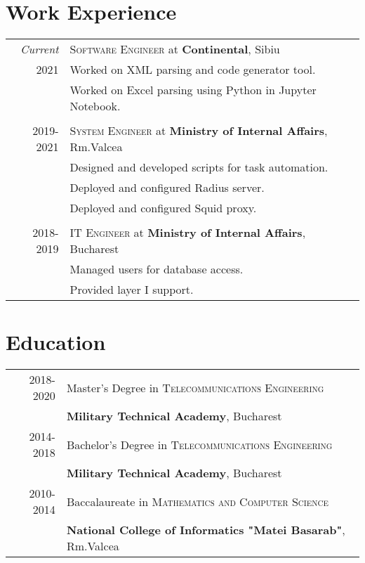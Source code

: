 \documentclass[a4paper,10pt]{article}
\begin{document}
\section{Work Experience}
\begin{tabular}{r|p{11cm}}
\emph{Current}
&\textsc{Software Engineer} at \textbf{Continental}, Sibiu\\
\textsc{2021}
&\footnotesize{Worked on XML parsing and code generator tool.}\\
&\footnotesize{Worked on Excel parsing using Python in Jupyter Notebook.}\\
\multicolumn{2}{c}{}\\
\textsc{2019-2021} 
&\textsc{System Engineer} at \textbf{Ministry of Internal Affairs}, Rm.Valcea\\
&\footnotesize{Designed and developed scripts for task automation.}\\
&\footnotesize{Deployed and configured Radius server.}\\
&\footnotesize{Deployed and configured Squid proxy.}\\
\multicolumn{2}{c}{}\\
\textsc{2018-2019} 
&\textsc{IT Engineer} at \textbf{Ministry of Internal Affairs}, Bucharest\\
&\footnotesize{Managed users for database access.}\\
&\footnotesize{Provided layer I support.}\\
\end{tabular}

\section{Education}
\begin{tabular}{rl}
\textsc{2018-2020}&Master's Degree in 
  \textsc{Telecommunications Engineering}\\
  &\textbf{Military Technical Academy}, Bucharest\\
\textsc{2014-2018}&Bachelor's Degree in
  \textsc{Telecommunications Engineering}\\
  &\textbf{Military Technical Academy}, Bucharest\\
\textsc{2010-2014}&Baccalaureate in 
  \textsc{Mathematics and Computer Science}\\
  &\textbf{National College of Informatics "Matei Basarab"}, Rm.Valcea\\
\end{tabular}
\end{document}
